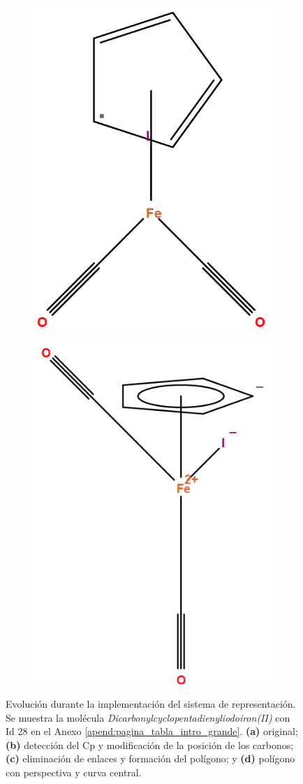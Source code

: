 \begin{figure}[h]
\begin{subfigure}{.35\textwidth}
  \caption{}
\end{subfigure}%
\\
\begin{subfigure}{.35\textwidth}
  \centering
  \includegraphics[width=.55\linewidth]{imagenes/resultados/evolucion_iron_c.png}
  \caption{}
\end{subfigure}%
\begin{subfigure}{.35\textwidth}
  \centering
  \includegraphics[width=.5\linewidth]{imagenes/resultados/moleculas/iron(II).png}
  \caption{}
  \label{fig:evolucion_iron_d}
\end{subfigure}%
\caption{Evolución durante la implementación del sistema de representación. Se muestra la molécula \textit{Dicarbonylcyclopentadienyliodoiron(II)} con Id 28 en el Anexo \ref{apend:pagina_tabla_intro_grande}. \textbf{(a)} original; \textbf{(b)} detección del Cp y modificación de la posición de los carbonos; \textbf{(c)} eliminación de enlaces y formación del polígono; y \textbf{(d)} polígono con perspectiva y curva central.}
\label{fig:evolucion_iron}
\end{figure}


